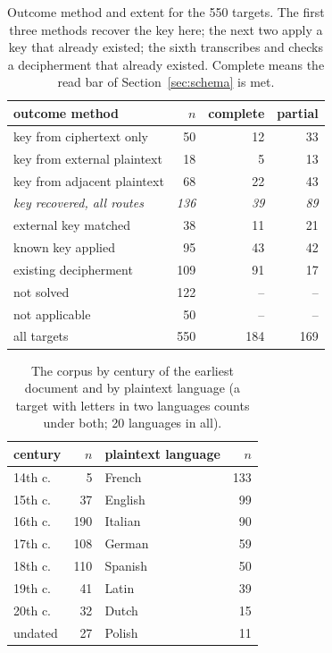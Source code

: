 \begin{table}[t]
\centering\small
\begin{tabular}{@{}lrrr@{}}
\toprule
outcome method & $n$ & complete & partial \\
\midrule
key from ciphertext only & 50 & 12 & 33 \\
key from external plaintext & 18 & 5 & 13 \\
key from adjacent plaintext & 68 & 22 & 43 \\
\quad\emph{key recovered, all routes} & \emph{136} & \emph{39} & \emph{89} \\
external key matched & 38 & 11 & 21 \\
known key applied & 95 & 43 & 42 \\
existing decipherment & 109 & 91 & 17 \\
\midrule
not solved & 122 & -- & -- \\
\midrule
not applicable & 50 & -- & -- \\
\midrule
all targets & 550 & 184 & 169 \\
\bottomrule
\end{tabular}
\caption{\label{tab:methods} Outcome method and extent for the 550 targets. The first three methods recover the key here; the next two apply a key that already existed; the sixth transcribes and checks a decipherment that already existed. Complete means the read bar of Section~\ref{sec:schema} is met.}
\end{table}

\begin{table}[t]
\centering\small
\begin{tabular}{@{}lr@{\qquad}lr@{}}
\toprule
century & $n$ & plaintext language & $n$ \\
\midrule
14th c. & 5 & French & 133 \\
15th c. & 37 & English & 99 \\
16th c. & 190 & Italian & 90 \\
17th c. & 108 & German & 59 \\
18th c. & 110 & Spanish & 50 \\
19th c. & 41 & Latin & 39 \\
20th c. & 32 & Dutch & 15 \\
undated & 27 & Polish & 11 \\
\bottomrule
\end{tabular}
\caption{\label{tab:corpus} The corpus by century of the earliest document and by plaintext language (a target with letters in two languages counts under both; 20 languages in all).}
\end{table}

